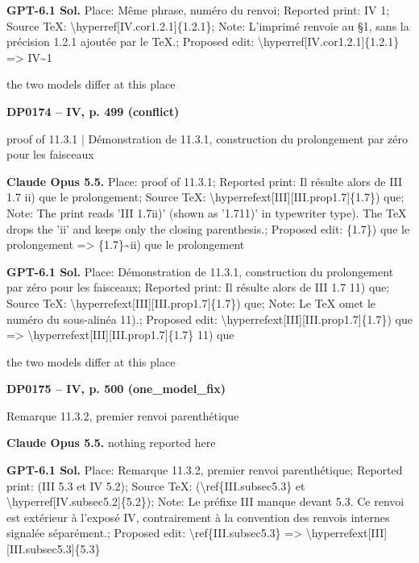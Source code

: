\textbf{GPT-6.1 Sol.} Place: Même phrase, numéro du renvoi; Reported print: IV 1; Source TeX: \textbackslash{}hyperref[IV.cor1.2.1]\{1.2.1\}; Note: L'imprimé renvoie au §1, sans la précision 1.2.1 ajoutée par le TeX.; Proposed edit: \textbackslash{}hyperref[IV.cor1.2.1]\{1.2.1\} =\allowbreak > IV\textasciitilde{}1\par
the two models differ at this place\par
\par\noindent\hypertarget{DP0174}{}\textbf{DP0174 -- IV, p. 499 (conflict)}\par
proof of 11.3.1 | Démonstration de 11.3.1, construction du prolongement par zéro pour les faisceaux\par
\textbf{Claude Opus 5.5.} Place: proof of 11.3.1; Reported print: Il résulte alors de III 1.7 ii) que le prolongement; Source TeX: \textbackslash{}hyperrefext[III][III.prop1.7]\{1.7\}) que; Note: The print reads 'III 1.7ii)' (shown as '1.711)' in typewriter type). The TeX drops the 'ii' and keeps only the closing parenthesis.; Proposed edit: \{1.7\}) que le prolongement =\allowbreak > \{1.7\}\textasciitilde{}ii) que le prolongement\par
\textbf{GPT-6.1 Sol.} Place: Démonstration de 11.3.1, construction du prolongement par zéro pour les faisceaux; Reported print: Il résulte alors de III 1.7 11) que; Source TeX: \textbackslash{}hyperrefext[III][III.prop1.7]\{1.7\}) que; Note: Le TeX omet le numéro du sous-alinéa 11).; Proposed edit: \textbackslash{}hyperrefext[III][III.prop1.7]\{1.7\}) que =\allowbreak > \textbackslash{}hyperrefext[III][III.prop1.7]\{1.7\} 11) que\par
the two models differ at this place\par
\par\noindent\hypertarget{DP0175}{}\textbf{DP0175 -- IV, p. 500 (one\_model\_fix)}\par
Remarque 11.3.2, premier renvoi parenthétique\par
\textbf{Claude Opus 5.5.} nothing reported here\par
\textbf{GPT-6.1 Sol.} Place: Remarque 11.3.2, premier renvoi parenthétique; Reported print: (III 5.3 et IV 5.2); Source TeX: (\textbackslash{}ref\{III.subsec5.3\} et \textbackslash{}hyperref[IV.subsec5.2]\{5.2\}); Note: Le préfixe III manque devant 5.3. Ce renvoi est extérieur à l'exposé IV, contrairement à la convention des renvois internes signalée séparément.; Proposed edit: \textbackslash{}ref\{III.subsec5.3\} =\allowbreak > \textbackslash{}hyperrefext[III][III.subsec5.3]\{5.3\}\par
